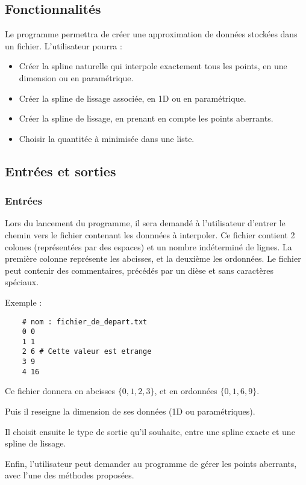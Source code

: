 \documentclass[a4paper,12pt]{article}
\begin{document}
\subsection{Fonctionnalités}
\label{Fonctions}

Le programme permettra de créer une approximation de données stockées dans un fichier. L'utilisateur pourra :
\begin{itemize}
\item Créer la spline naturelle qui interpole exactement tous les points, en une dimension ou en paramétrique.
\item Créer la spline de lissage associée, en  1D ou en paramétrique.
\item Créer la spline de lissage, en prenant en compte les points aberrants.
\item Choisir la quantitée à minimisée dans une liste.
\end{itemize}

\subsection{Entrées et sorties}

\subsubsection{Entrées}

Lors du lancement du programme, il sera demandé à l'utilisateur d'entrer le chemin vers le fichier contenant les donnnées à interpoler.
Ce fichier contient 2 colones (représentées par des espaces) et un nombre indéterminé de lignes. La première colonne représente les abcisses, et la deuxième les ordonnées. Le fichier peut contenir des commentaires, précédés par un dièse et sans caractères spéciaux.

Exemple :

\begin{lstlisting}
    # nom : fichier_de_depart.txt
    0 0
    1 1
    2 6 # Cette valeur est etrange
    3 9
    4 16
\end{lstlisting}

Ce fichier donnera en abcisses  $\{0,1,2,3\}$, et en ordonnées $\{0,1,6,9\}$.

Puis il reseigne la dimension de ses données (1D ou paramétriques).

Il choisit ensuite le type de sortie qu'il souhaite, entre une spline exacte et une spline de lissage.

Enfin, l'utilisateur peut demander au programme de gérer les points aberrants, avec l'une des méthodes proposées.
\end{document}
